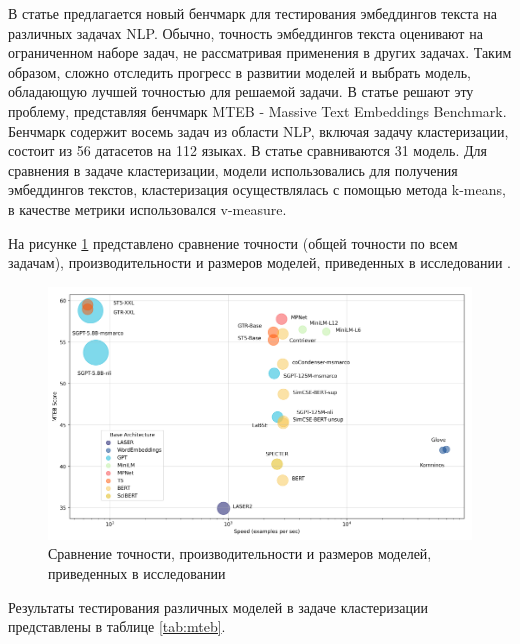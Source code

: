 В статье \cite{mteb} предлагается новый бенчмарк для тестирования эмбеддингов текста на различных задачах NLP. Обычно, точность эмбеддингов текста оценивают на ограниченном наборе задач, не рассматривая применения в других задачах. Таким образом, сложно отследить прогресс в развитии моделей и выбрать модель, обладающую лучшей  точностью для решаемой задачи. В статье решают эту проблему, представляя бенчмарк MTEB - Massive Text Embeddings Benchmark. Бенчмарк содержит восемь задач из области NLP, включая задачу кластеризации, состоит из 56 датасетов на 112 языках. В статье сравниваются 31 модель. Для сравнения в задаче кластеризации, модели использовались для получения эмбеддингов текстов, кластеризация осуществлялась с помощью метода k-means, в качестве метрики использовался v-measure.


На рисунке \ref{img:mteb_models} представлено сравнение точности (общей точности по всем задачам), производительности и размеров моделей, приведенных в исследовании \cite{mteb}.

\begin{figure}[h]
    \centering
    \includegraphics[width=\linewidth]{images/mteb-models.png}
    \caption{Сравнение точности, производительности и размеров моделей, приведенных в исследовании \cite{mteb}}
    \label{img:mteb_models}
\end{figure}

Результаты тестирования различных моделей в задаче кластеризации представлены в таблице \ref{tab:mteb}.

